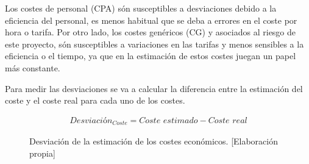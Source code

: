 Los costes de personal (CPA) són susceptibles a desviaciones debido a la eficiencia del personal, es menos
habitual que se deba a errores en el coste por hora o tarifa. Por otro lado, los costes genéricos (CG) y asociados
al riesgo de este proyecto, són susceptibles a variaciones en las tarifas y menos sensibles a la eficiencia o el
tiempo, ya que en la estimación de estos costes juegan un papel más constante.

Para medir las desviaciones se va a calcular la diferencia entre la estimación
del coste y el coste real para cada uno de los costes.
\begin{figure}[H]
    \begin{align*}
        \textit{Desviación}_{Coste} = \textit{Coste estimado} - \textit{Coste real}
    \end{align*}
    \caption{Desviación de la estimación de los costes económicos.  [Elaboración propia]}
\end{figure}